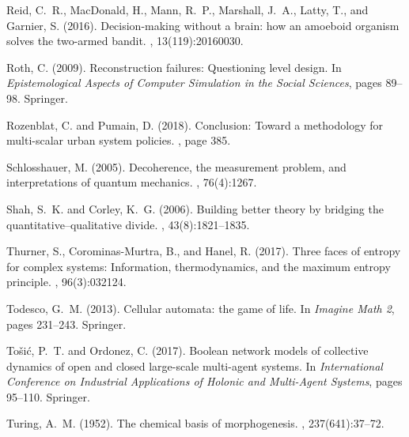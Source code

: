 \begin{thebibliography}{}
Reid, C.~R., MacDonald, H., Mann, R.~P., Marshall, J.~A., Latty, T., and
  Garnier, S. (2016).
\newblock Decision-making without a brain: how an amoeboid organism solves the
  two-armed bandit.
, 13(119):20160030.

Roth, C. (2009).
\newblock Reconstruction failures: Questioning level design.
\newblock In {\em Epistemological Aspects of Computer Simulation in the Social
  Sciences}, pages 89--98. Springer.

Rozenblat, C. and Pumain, D. (2018).
\newblock Conclusion: Toward a methodology for multi-scalar urban system
  policies.
,
  page 385.

Schlosshauer, M. (2005).
\newblock Decoherence, the measurement problem, and interpretations of quantum
  mechanics.
, 76(4):1267.

Shah, S.~K. and Corley, K.~G. (2006).
\newblock Building better theory by bridging the quantitative--qualitative
  divide.
, 43(8):1821--1835.

Thurner, S., Corominas-Murtra, B., and Hanel, R. (2017).
\newblock Three faces of entropy for complex systems: Information,
  thermodynamics, and the maximum entropy principle.
, 96(3):032124.

Todesco, G.~M. (2013).
\newblock Cellular automata: the game of life.
\newblock In {\em Imagine Math 2}, pages 231--243. Springer.

To{\v{s}}i{\'c}, P.~T. and Ordonez, C. (2017).
\newblock Boolean network models of collective dynamics of open and closed
  large-scale multi-agent systems.
\newblock In {\em International Conference on Industrial Applications of
  Holonic and Multi-Agent Systems}, pages 95--110. Springer.

Turing, A.~M. (1952).
\newblock The chemical basis of morphogenesis.
, 237(641):37--72.


\end{thebibliography}
